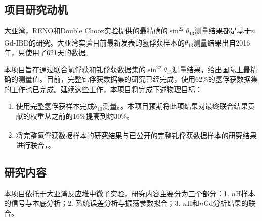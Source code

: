 \documentclass[a4paper,zihao=-4]{article}
\newcommand{\citess}[1]{\textsuperscript{\cite{#1}}}
\begin{document}
\subsection{项目研究动机}
大亚湾，RENO和Double Chooz实验提供的最精确的$\sin^22\theta_{13}$测量结果都是基于$n$Gd-IBD的研究。大亚湾实验目前最新发表的氢俘获样本的$\theta_{13}$测量结果\citess{DayaBay:2016ziq}出自2016年，只使用了621天的数据。

本项目旨在通过联合氢俘获和钆俘获数据集的$\sin^22\theta_{13}$测量结果，给出国际上最精确的测量值。目前，完整钆俘获数据集的研究已经完成，使用62\%的氢俘获数据集的工作也已完成。延续这些工作，本项目将完成下述物理目标：
\begin{enumerate}
	\item 使用完整氢俘获样本完成$\theta_{13}$测量。。本项目预期将此项结果对最终联合结果贡献的权重从之前的16\%提高到约30\%。
	\item 将完整氢俘获数据样本的研究结果与已公开的完整钆俘获数据样本的研究结果\citess{DayaBay:2022orm}进行联合，。
\end{enumerate}

\begin{spacing}{1.3} %
	 \songti   
	
	  
	\vspace{11bp}
\end{spacing}

\subsection{研究内容}

本项目依托于大亚湾反应堆中微子实验，研究内容主要分为三个部分：1. $n$H样本的信号与本底分析；2. 系统误差分析与振荡参数拟合；3. $n$H和$n$Gd分析结果的联合。
\end{document}
